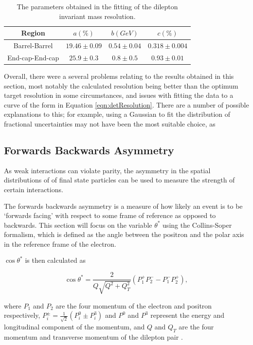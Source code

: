 \documentclass{article}
\begin{document}
\begin{table}[h!t]
\centering
\caption{The parameters obtained in the fitting of the dilepton invariant mass resolution. \label{table:dileptonResolution}}
\begin{tabular}{ |c|c|c|c| } 
\hline
Region & $a (\%)$ & $b (GeV)$ & $c (\%)$\\\hline
Barrel-Barrel & $19.46\pm0.09$ & $0.54\pm0.04$ & $0.318\pm0.004$ \\\hline
End-cap-End-cap & $25.9\pm0.3$ & $0.8\pm0.5$ & $0.93\pm0.01$ \\\hline
\end{tabular}
\end{table}

Overall, there were a several problems relating to the results obtained in this section, most notably the calculated resolution being better than the optimum target resolution in some circumstances, and issues with fitting the data to a curve of the form in Equation \ref{eqn:detResolution}. 
There are a number of possible explanations to this; for example, using a Gaussian to fit the distribution of fractional uncertainties may not have been the most suitable choice, as 


\subsection{Forwards Backwards Asymmetry}
\label{sec:study_fwAsym}


As weak interactions can violate parity, the asymmetry in the spatial distributions of of final state particles can be used to measure the strength of certain interactions.
 
The forwards backwards asymmetry is a measure of how likely an event is to be `forwards facing' with respect to some frame of reference as opposed to backwards. This section will focus on the variable $\theta^*$ using the Collins-Soper formalism, which is defined as the angle between the positron and the polar axis in the reference frame of the electron.

$\cos\theta^*$ is then calculated as

\begin{equation}
\cos\theta^* = \frac{2}{Q\sqrt{Q^2 + Q^{2}_{T}}}( P^{+}_{1}P^{-}_{2} - P^{-}_{1}P^{+}_{2} ),
\end{equation}

where $P_1$ and $P_2$ are the four momentum of the electron and positron respectively, $P^{\pm}_{i} = \frac{1}{\sqrt{2}}(P^{0}_{i} \pm P^{3}_{i})$ and $P^0$ and $P^3$ represent the energy and longitudinal component of the momentum, and $Q$ and $Q_T$ are the four momentum and transverse momentum of the dilepton pair \cite{ForwardsBackwardsAsymmetry}.
\end{document}
